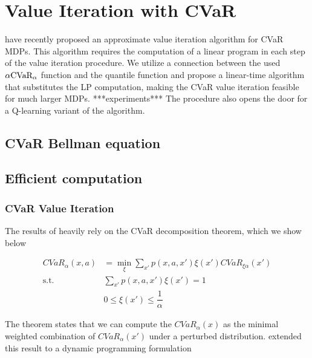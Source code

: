 \chapter{Value Iteration with CVaR}\label{ch:introduction}

\citet{chow2015risk} have recently proposed an approximate value iteration algorithm for CVaR MDPs. This algorithm requires the computation of a linear program in each step of the value iteration procedure. We utilize a connection between the used $\alpha \text{CVaR}_\alpha$ function and the quantile function and propose a linear-time algorithm that substitutes the LP computation, making the CVaR value iteration feasible for much larger MDPs. ***experiments*** The procedure also opens the door for a Q-learning variant of the algorithm.



\section{CVaR Bellman equation}


\section{Efficient computation}


\subsection{CVaR Value Iteration}

The results of \cite{chow2015risk} heavily rely on the CVaR decomposition theorem, which we show below

\begin{equation}\label{eq:cvardecomp}
\begin{split}
CVaR_\alpha(x, a)&=\min_{\xi} \sum_{x'} p(x, a, x')\xi(x') CVaR_{\xi\alpha}(x')\\
\text{s.t.}\quad &\sum_{x'}p(x, a, x')\xi(x')=1\\
&0 \le \xi(x')\le \dfrac{1}{\alpha}
\end{split}
\end{equation}

The theorem states that we can compute the $CVaR_\alpha(x)$ as the minimal weighted combination of $CVaR_\alpha(x')$ under a perturbed distribution. \cite{chow2015risk} extended this result to a dynamic programming formulation

